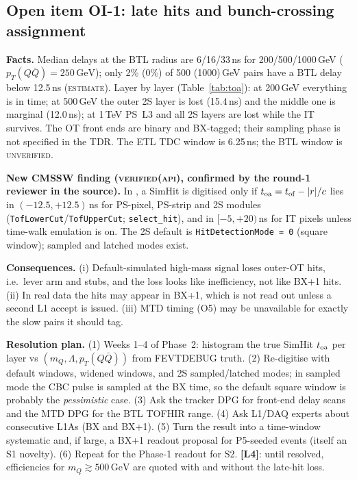 \documentclass[11pt,a4paper]{article}
\newcommand{\EST}{\textsc{estimate}}
\newcommand{\UNV}{\textsc{unverified}}
\newcommand{\VAPI}{\textsc{verified(api)}}
\DeclareRobustCommand{\file}[1]{\path{#1}}
\newcommand{\mQ}{m_Q}
\newcommand{\GeV}{\,\mathrm{GeV}}
\newcommand{\pTQQ}{p_T(Q\bar Q)}
\newcommand{\lab}[1]{\textbf{[#1]}}
\begin{document}
\subsection{Open item OI-1: late hits and bunch-crossing assignment}\label{sec:oi1}
\textbf{Facts.} Median delays at the BTL radius are 6/16/33\,ns for 200/500/1000\,GeV ($\pTQQ=250\GeV$); only 2\% (0\%) of 500 (1000)\,GeV pairs have a BTL delay below 12.5\,ns (\EST). Layer by layer (Table~\ref{tab:toa}): at 200\,GeV everything is in time; at 500\,GeV the outer 2S layer is lost (15.4\,ns) and the middle one is marginal (12.0\,ns); at 1\,TeV PS~L3 and all 2S layers are lost while the IT survives. The OT front ends are binary and BX-tagged; their sampling phase is not specified in the TDR. The ETL TDC window is 6.25\,ns; the BTL window is \UNV.

\textbf{New CMSSW finding (\VAPI, confirmed by the round-1 reviewer in the source).} In \file{SimTracker/SiPhase2Digitizer}, a SimHit is digitised only if $t_{\rm oa}=t_{\rm of}-|r|/c$ lies in $(-12.5,+12.5)$\,ns for PS-pixel, PS-strip and 2S modules (\texttt{TofLowerCut}/\texttt{TofUpperCut}; \texttt{select\_hit}), and in $[-5,+20)$\,ns for IT pixels unless time-walk emulation is on. The 2S default is \texttt{HitDetectionMode = 0} (square window); sampled and latched modes exist.

\textbf{Consequences.} (i) Default-simulated high-mass signal loses outer-OT hits, i.e.\ lever arm and stubs, and the loss looks like inefficiency, not like BX+1 hits. (ii) In real data the hits may appear in BX+1, which is not read out unless a second L1 accept is issued. (iii) MTD timing (O5) may be unavailable for exactly the slow pairs it should tag.

\textbf{Resolution plan.} (1) Weeks 1--4 of Phase~2: histogram the true SimHit $t_{\rm oa}$ per layer vs $(\mQ,\Lambda,\pTQQ)$ from FEVTDEBUG truth. (2) Re-digitise with default windows, widened windows, and 2S sampled/latched modes; in sampled mode the CBC pulse is sampled at the BX time, so the default square window is probably the \emph{pessimistic} case. (3) Ask the tracker DPG for front-end delay scans and the MTD DPG for the BTL TOFHIR range. (4) Ask L1/DAQ experts about consecutive L1As (BX and BX+1). (5) Turn the result into a time-window systematic and, if large, a BX+1 readout proposal for P5-seeded events (itself an S1 novelty). (6) Repeat for the Phase-1 readout for S2. \lab{L4}: until resolved, efficiencies for $\mQ\gtrsim500\GeV$ are quoted with and without the late-hit loss.
\end{document}
